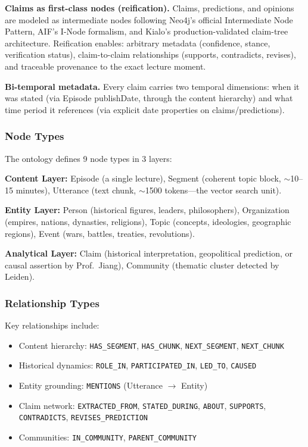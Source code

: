 \textbf{Claims as first-class nodes (reification).} Claims, predictions, and opinions are modeled as intermediate nodes following Neo4j's official Intermediate Node Pattern, AIF's I-Node formalism, and Kialo's production-validated claim-tree architecture. Reification enables: arbitrary metadata (confidence, stance, verification status), claim-to-claim relationships (supports, contradicts, revises), and traceable provenance to the exact lecture moment.

\textbf{Bi-temporal metadata.} Every claim carries two temporal dimensions: when it was stated (via Episode publishDate, through the content hierarchy) and what time period it references (via explicit date properties on claims/predictions).

\subsubsection{Node Types}

The ontology defines 9 node types in 3 layers:

\textbf{Content Layer:} Episode (a single lecture), Segment (coherent topic block, $\sim$10--15 minutes), Utterance (text chunk, $\sim$1500 tokens---the vector search unit).

\textbf{Entity Layer:} Person (historical figures, leaders, philosophers), Organization (empires, nations, dynasties, religions), Topic (concepts, ideologies, geographic regions), Event (wars, battles, treaties, revolutions).

\textbf{Analytical Layer:} Claim (historical interpretation, geopolitical prediction, or causal assertion by Prof.\ Jiang), Community (thematic cluster detected by Leiden).

\subsubsection{Relationship Types}

Key relationships include:
\begin{itemize}
    \item Content hierarchy: \texttt{HAS\_SEGMENT}, \texttt{HAS\_CHUNK}, \texttt{NEXT\_SEGMENT}, \texttt{NEXT\_CHUNK}
    \item Historical dynamics: \texttt{ROLE\_IN}, \texttt{PARTICIPATED\_IN}, \texttt{LED\_TO}, \texttt{CAUSED}
    \item Entity grounding: \texttt{MENTIONS} (Utterance $\rightarrow$ Entity)
    \item Claim network: \texttt{EXTRACTED\_FROM}, \texttt{STATED\_DURING}, \texttt{ABOUT}, \texttt{SUPPORTS}, \texttt{CONTRADICTS}, \texttt{REVISES\_PREDICTION}
    \item Communities: \texttt{IN\_COMMUNITY}, \texttt{PARENT\_COMMUNITY}
\end{itemize}

